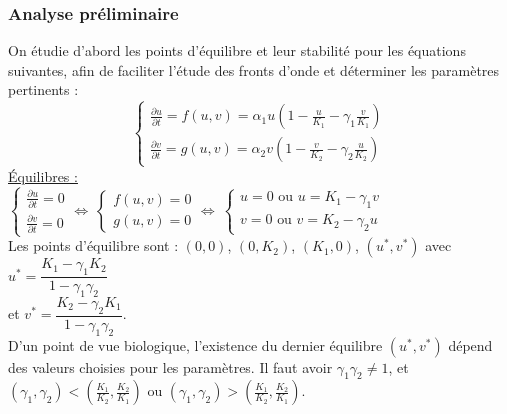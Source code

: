 \documentclass[a4paper,11pt]{article}
\begin{document}
\subsubsection{Analyse préliminaire}
On étudie d'abord les points d'équilibre et leur stabilité pour les équations suivantes, afin de faciliter l'étude des fronts d'onde et déterminer les paramètres pertinents :
$$\begin{cases}
\frac{\partial u}{\partial t} = f(u,v) = \alpha_1 u\left(1-\frac{u}{K_1}-\gamma_1\frac{v}{K_1}\right)\\
\frac{\partial v}{\partial t} = g(u,v) = \alpha_2 v\left(1 - \frac{v}{K_2} - \gamma_2\frac{u}{K_2}\right)
\end{cases}$$
\noindent \underline{Équilibres :}\\

$\begin{cases}
\frac{\partial u}{\partial t} = 0\\
\frac{\partial v}{\partial t} = 0
\end{cases} \Leftrightarrow \
\begin{cases}
f(u,v)=0\\
g(u,v)=0
\end{cases} \Leftrightarrow \
\begin{cases}
u = 0 \text{ ou } u = K_1 - \gamma_1 v\\
v = 0 \text{ ou } v = K_2 - \gamma_2 u
\end{cases}$\\

\noindent Les points d'équilibre sont : $(0,0)$, $(0,K_2)$, $(K_1,0)$, $(u^*,v^*)$ avec 
$u^* = \dfrac{K_1 - \gamma_1 K_2}{1-\gamma_1 \gamma_2}$ \\
et $v^* = \dfrac{K_2 - \gamma_2 K_1}{1-\gamma_1 \gamma_2}$.\\ 

D'un point de vue biologique, l'existence du dernier équilibre $(u^*,v^*)$ dépend des valeurs choisies pour les paramètres. Il faut avoir $\gamma_1\gamma_2 \neq 1$, et $(\gamma_1,\gamma_2) < \left(\frac{K_1}{K_2},\frac{K_2}{K_1}\right)$ 
ou $(\gamma_1,\gamma_2) > \left(\frac{K_1}{K_2},\frac{K_2}{K_1}\right)$.\\
\end{document}
